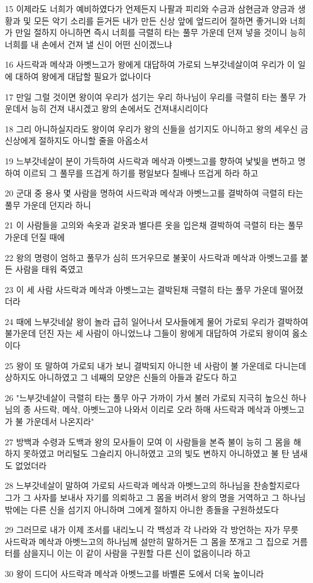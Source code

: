 \par 15 이제라도 너희가 예비하였다가 언제든지 나팔과 피리와 수금과 삼현금과 양금과 생황과 및 모든 악기 소리를 듣거든 내가 만든 신상 앞에 엎드리어 절하면 좋거니와 너희가 만일 절하지 아니하면 즉시 너희를 극렬히 타는 풀무 가운데 던져 넣을 것이니 능히 너희를 내 손에서 건져 낼 신이 어떤 신이겠느냐
\par 16 사드락과 메삭과 아벳느고가 왕에게 대답하여 가로되 느부갓네살이여 우리가 이 일에 대하여 왕에게 대답할 필요가 없나이다
\par 17 만일 그럴 것이면 왕이여 우리가 섬기는 우리 하나님이 우리를 극렬히 타는 풀무 가운데서 능히 건져 내시겠고 왕의 손에서도 건져내시리이다
\par 18 그리 아니하실지라도 왕이여 우리가 왕의 신들을 섬기지도 아니하고 왕의 세우신 금 신상에게 절하지도 아니할 줄을 아옵소서
\par 19 느부갓네살이 분이 가득하여 사드락과 메삭과 아벳느고를 향하여 낯빛을 변하고 명하여 이르되 그 풀무를 뜨겁게 하기를 평일보다 칠배나 뜨겁게 하라 하고
\par 20 군대 중 용사 몇 사람을 명하여 사드락과 메삭과 아벳느고를 결박하여 극렬히 타는 풀무 가운데 던지라 하니
\par 21 이 사람들을 고의와 속옷과 겉옷과 별다른 옷을 입은채 결박하여 극렬히 타는 풀무 가운데 던질 때에
\par 22 왕의 명령이 엄하고 풀무가 심히 뜨거우므로 불꽃이 사드락과 메삭과 아벳느고를 붙든 사람을 태워 죽였고
\par 23 이 세 사람 사드락과 메삭과 아벳느고는 결박된채 극렬히 타는 풀무 가운데 떨어졌더라
\par 24 때에 느부갓네살 왕이 놀라 급히 일어나서 모사들에게 물어 가로되 우리가 결박하여 불가운데 던진 자는 세 사람이 아니었느냐 그들이 왕에게 대답하여 가로되 왕이여 옳소이다
\par 25 왕이 또 말하여 가로되 내가 보니 결박되지 아니한 네 사람이 불 가운데로 다니는데 상하지도 아니하였고 그 네째의 모양은 신들의 아들과 같도다 하고
\par 26 "느부갓네살이 극렬히 타는 풀무 아구 가까이 가서 불러 가로되 지극히 높으신 하나님의 종 사드락, 메삭, 아벳느고야 나와서 이리로 오라 하매 사드락과 메삭과 아벳느고가 불 가운데서 나온지라"
\par 27 방백과 수령과 도백과 왕의 모사들이 모여 이 사람들을 본즉 불이 능히 그 몸을 해하지 못하였고 머리털도 그슬리지 아니하였고 고의 빛도 변하지 아니하였고 불 탄 냄새도 없었더라
\par 28 느부갓네살이 말하여 가로되 사드락과 메삭과 아벳느고의 하나님을 찬송할지로다 그가 그 사자를 보내사 자기를 의뢰하고 그 몸을 버려서 왕의 명을 거역하고 그 하나님 밖에는 다른 신을 섬기지 아니하며 그에게 절하지 아니한 종들을 구원하셨도다
\par 29 그러므로 내가 이제 조서를 내리노니 각 백성과 각 나라와 각 방언하는 자가 무릇 사드락과 메삭과 아벳느고의 하나님께 설만히 말하거든 그 몸을 쪼개고 그 집으로 거름터를 삼을지니 이는 이 같이 사람을 구원할 다른 신이 없음이니라 하고
\par 30 왕이 드디어 사드락과 메삭과 아벳느고를 바벨론 도에서 더욱 높이니라

